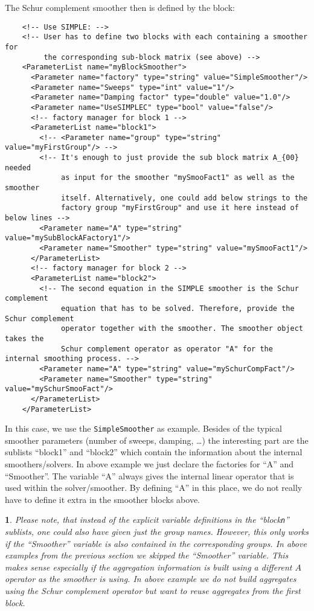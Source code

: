 \documentclass[10pt,fleqn]{book}
\newtheorem*{mycomment}{\ding{42}}
\begin{document}
The Schur complement smoother then is defined by the block:

\begin{lstlisting}
    <!-- Use SIMPLE: -->
    <!-- User has to define two blocks with each containing a smoother for
         the corresponding sub-block matrix (see above) -->
    <ParameterList name="myBlockSmoother">
      <Parameter name="factory" type="string" value="SimpleSmoother"/>
      <Parameter name="Sweeps" type="int" value="1"/>
      <Parameter name="Damping factor" type="double" value="1.0"/>
      <Parameter name="UseSIMPLEC" type="bool" value="false"/>
      <!-- factory manager for block 1 -->
      <ParameterList name="block1">
        <!-- <Parameter name="group" type="string" value="myFirstGroup"/> -->
        <!-- It's enough to just provide the sub block matrix A_{00} needed
             as input for the smoother "mySmooFact1" as well as the smoother
             itself. Alternatively, one could add below strings to the
             factory group "myFirstGroup" and use it here instead of below lines -->
        <Parameter name="A" type="string" value="mySubBlockAFactory1"/>
        <Parameter name="Smoother" type="string" value="mySmooFact1"/>
      </ParameterList>
      <!-- factory manager for block 2 -->
      <ParameterList name="block2">
        <!-- The second equation in the SIMPLE smoother is the Schur complement
             equation that has to be solved. Therefore, provide the Schur complement
             operator together with the smoother. The smoother object takes the
             Schur complement operator as operator "A" for the internal smoothing process. -->
        <Parameter name="A" type="string" value="mySchurCompFact"/>
        <Parameter name="Smoother" type="string" value="mySchurSmooFact"/>
      </ParameterList>
    </ParameterList>
\end{lstlisting}

In this case, we use the \texttt{SimpleSmoother} as example. Besides of the typical smoother parameters (number of sweeps, damping, \ldots) the interesting part are the sublists ``block1'' and ``block2'' which contain the information about the internal smoothers/solvers. In above example we just declare the factories for ``A'' and ``Smoother''. The variable ``A'' always gives the internal linear operator that is used within the solver/smoother. By defining ``A'' in this place, we do not really have to define it extra in the smoother blocks above.

\begin{mycomment}
Please note, that instead of the explicit variable definitions in the ``block\texttt{n}'' sublists, one could also have given just the group names. However, this only works if the ``Smoother'' variable is also contained in the corresponding groups. In above examples from the previous section we skipped the ``Smoother'' variable. This makes sense especially if the aggregation information is built using a different $A$ operator as the smoother is using. In above example we do not build aggregates using the Schur complement operator but want to reuse aggregates from the first block.
\end{mycomment}
\end{document}
